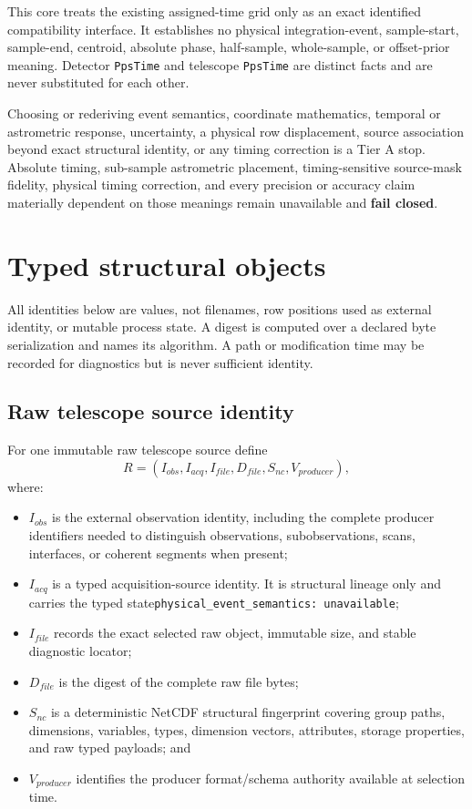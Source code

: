 \documentclass[11pt]{article}
\newcommand{\code}[1]{\texttt{#1}}
\newcommand{\failclosed}{\textbf{fail closed}}
\newcommand{\typedunavailable}{\code{physical\_event\_semantics:}\allowbreak\ \code{unavailable}}
\begin{document}
This core treats the existing assigned-time grid only as an exact identified
compatibility interface.  It establishes no physical integration-event,
sample-start, sample-end, centroid, absolute phase, half-sample, whole-sample,
or offset-prior meaning.  Detector \code{PpsTime} and telescope
\code{PpsTime} are distinct facts and are never substituted for each other.

Choosing or rederiving event semantics, coordinate mathematics, temporal or
astrometric response, uncertainty, a physical row displacement, source
association beyond exact structural identity, or any timing correction is a
Tier A stop.  Absolute timing, sub-sample astrometric placement,
timing-sensitive source-mask fidelity, physical timing correction, and every
precision or accuracy claim materially dependent on those meanings remain
unavailable and \failclosed.

\section{Typed structural objects}

All identities below are values, not filenames, row positions used as external
identity, or mutable process state.  A digest is computed over a declared byte
serialization and names its algorithm.  A path or modification time may be
recorded for diagnostics but is never sufficient identity.

\subsection{Raw telescope source identity}

For one immutable raw telescope source define
\[
R = (I_{obs}, I_{acq}, I_{file}, D_{file}, S_{nc}, V_{producer}),
\]
where:

\begin{itemize}
\item $I_{obs}$ is the external observation identity, including the complete
  producer identifiers needed to distinguish observations, subobservations,
  scans, interfaces, or coherent segments when present;
\item $I_{acq}$ is a typed acquisition-source identity.  It is structural
  lineage only and carries the typed state\newline \typedunavailable;
\item $I_{file}$ records the exact selected raw object, immutable size, and
  stable diagnostic locator;
\item $D_{file}$ is the digest of the complete raw file bytes;
\item $S_{nc}$ is a deterministic NetCDF structural fingerprint covering group
  paths, dimensions, variables, types, dimension vectors, attributes, storage
  properties, and raw typed payloads; and
\item $V_{producer}$ identifies the producer format/schema authority available
  at selection time.
\end{itemize}
\end{document}
